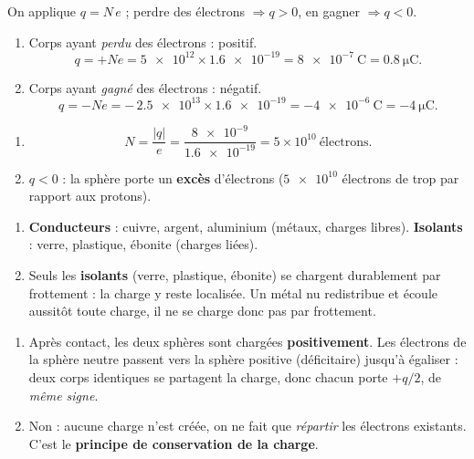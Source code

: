 \documentclass[11pt,a4paper]{article}
\begin{document}

\begin{corrige}
On applique $q = N\,e$ ; perdre des électrons $\Rightarrow q>0$, en gagner $\Rightarrow q<0$.
\begin{enumerate}[label=\alph*)]
  \item Corps ayant \emph{perdu} des électrons : positif.
        \[ q = +N e = \num{5e12}\times\num{1.6e-19} = \SI{8e-7}{\coulomb} = \SI{0.8}{\micro\coulomb}. \]
  \item Corps ayant \emph{gagné} des électrons : négatif.
        \[ q = -N e = -\,\num{2.5e13}\times\num{1.6e-19} = \SI{-4e-6}{\coulomb} = \SI{-4}{\micro\coulomb}. \]
\end{enumerate}
\end{corrige}

\begin{corrige}
\begin{enumerate}[label=\alph*)]
  \item \[ N = \frac{|q|}{e} = \frac{\num{8e-9}}{\num{1.6e-19}} = 5\times 10^{10}\ \text{électrons}. \]
  \item $q<0$ : la sphère porte un \textbf{excès} d'électrons ($\num{5e10}$ électrons de trop par
        rapport aux protons).
\end{enumerate}
\end{corrige}

\begin{corrige}
\begin{enumerate}[label=\alph*)]
  \item \textbf{Conducteurs} : cuivre, argent, aluminium (métaux, charges libres). \quad
        \textbf{Isolants} : verre, plastique, ébonite (charges liées).
  \item Seuls les \textbf{isolants} (verre, plastique, ébonite) se chargent durablement par
        frottement : la charge y reste localisée. Un métal nu redistribue et écoule aussitôt toute
        charge, il ne se charge donc pas par frottement.
\end{enumerate}
\end{corrige}

\begin{corrige}
\begin{enumerate}[label=\alph*)]
  \item Après contact, les deux sphères sont chargées \textbf{positivement}. Les électrons de la
        sphère neutre passent vers la sphère positive (déficitaire) jusqu'à égaliser : deux corps
        identiques se partagent la charge, donc chacun porte $+q/2$, de \emph{même signe}.
  \item Non : aucune charge n'est créée, on ne fait que \emph{répartir} les électrons existants.
        C'est le \textbf{principe de conservation de la charge}.
\end{enumerate}
\end{corrige}
\end{document}
